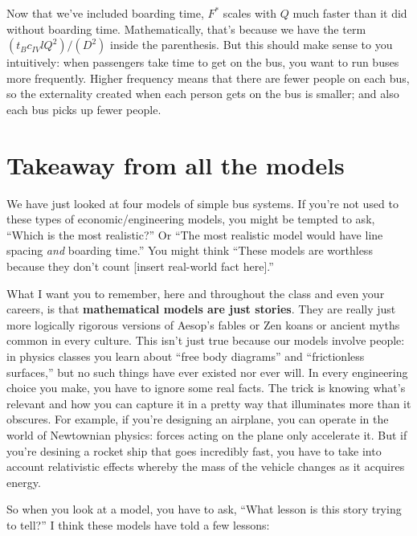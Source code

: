 \documentclass[11pt]{article}
\begin{document}
Now that we've included boarding time, \(F^*\) scales with \(Q\) much
faster than it did without boarding time. Mathematically, that's because
we have the term \((t_B c_{IV}lQ^2)/(D^2)\) inside the parenthesis. But
this should make sense to you intuitively: when passengers take time to
get on the bus, you want to run buses more frequently. Higher frequency
means that there are fewer people on each bus, so the externality
created when each person gets on the bus is smaller; and also each bus
picks up fewer people.

    \section{Takeaway from all the
models}\label{takeaway-from-all-the-models}

We have just looked at four models of simple bus systems. If you're not
used to these types of economic/engineering models, you might be tempted
to ask, ``Which is the most realistic?'' Or ``The most realistic model
would have line spacing \emph{and} boarding time.'' You might think
``These models are worthless because they don't count {[}insert
real-world fact here{]}.''

What I want you to remember, here and throughout the class and even your
careers, is that \textbf{mathematical models are just stories}. They are
really just more logically rigorous versions of Aesop's fables or Zen
koans or ancient myths common in every culture. This isn't just true
because our models involve people: in physics classes you learn about
``free body diagrams'' and ``frictionless surfaces,'' but no such things
have ever existed nor ever will. In every engineering choice you make,
you have to ignore some real facts. The trick is knowing what's relevant
and how you can capture it in a pretty way that illuminates more than it
obscures. For example, if you're designing an airplane, you can operate
in the world of Newtownian physics: forces acting on the plane only
accelerate it. But if you're desining a rocket ship that goes incredibly
fast, you have to take into account relativistic effects whereby the
mass of the vehicle changes as it acquires energy.

So when you look at a model, you have to ask, ``What lesson is this
story trying to tell?'' I think these models have told a few lessons:
\end{document}
